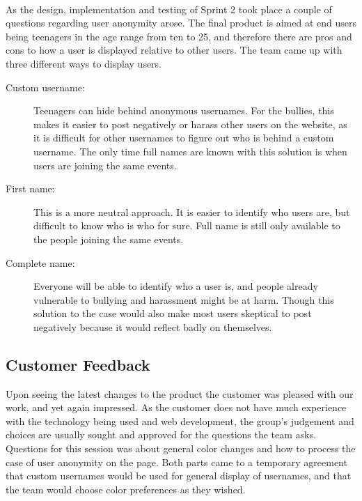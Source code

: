 \paragraph{} As the design, implementation and testing of Sprint 2 took place a couple of questions regarding user anonymity arose. The final product is aimed at end users being teenagers in the age range from ten to 25, and therefore there are pros and cons to how a user is displayed relative to other users. The team came up with three different ways to display users. 

\begin{description}
\item[Custom username: ] Teenagers can hide behind anonymous usernames. For the bullies, this makes it easier to post negatively or harass other users on the website, as it is difficult for other usernames to figure out who is behind a custom username. The only time full names are known with this solution is when users are joining the same events. 
\item[First name: ] This is a more neutral approach. It is easier to identify who users are, but difficult to know who is who for sure. Full name is still only available to the people joining the same events.
\item[Complete name: ] Everyone will be able to identify who a user is, and people already vulnerable to bullying and harassment might be at harm. Though this solution to the case would also make most users skeptical to post negatively because it would reflect badly on themselves. 
\end{description}


\subsection{Customer Feedback}
\label{subsec:S2RetrospectiveFeedback}
Upon seeing the latest changes to the product the customer was pleased with our work, and yet again impressed. As the customer does not have much experience with the technology being used and web development, the group's judgement and choices are usually sought and approved for the questions the team asks. Questions for this session was about general color changes and how to process the case of user anonymity on the page. Both parts came to a temporary agreement that custom usernames would be used for general display of usernames, and that the team would choose color preferences as they wished.
